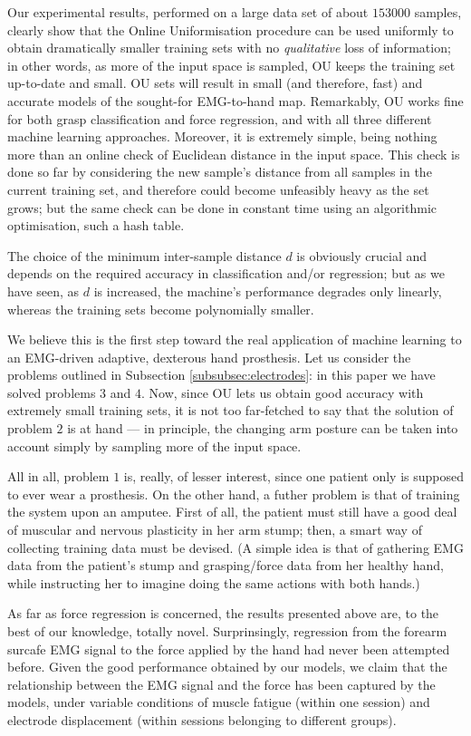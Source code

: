Our experimental results, performed on a large data set of about
$153000$ samples, clearly show that the Online Uniformisation
procedure can be used uniformly to obtain dramatically smaller
training sets with no \emph{qualitative} loss of information; in other
words, as more of the input space is sampled, OU keeps the training
set up-to-date and small. OU sets will result in small (and therefore,
fast) and accurate models of the sought-for EMG-to-hand
map. Remarkably, OU works fine for both grasp classification and force
regression, and with all three different machine learning
approaches. Moreover, it is extremely simple, being nothing more than
an online check of Euclidean distance in the input space. This check
is done so far by considering the new sample's distance from all
samples in the current training set, and therefore could become
unfeasibly heavy as the set grows; but the same check can be done in
constant time using an algorithmic optimisation, such a hash table.

The choice of the minimum inter-sample distance $d$ is obviously
crucial and depends on the required accuracy in classification and/or
regression; but as we have seen, as $d$ is increased, the machine's
performance degrades only linearly, whereas the training sets become
polynomially smaller.

We believe this is the first step toward the real application of
machine learning to an EMG-driven adaptive, dexterous hand
prosthesis. Let us consider the problems outlined in Subsection
\ref{subsubsec:electrodes}: in this paper we have solved problems
$3$ and $4$. Now, since OU lets us obtain good accuracy with extremely
small training sets, it is not too far-fetched to say that the
solution of problem $2$ is at hand --- in principle, the changing arm
posture can be taken into account simply by sampling more of the input
space.

All in all, problem $1$ is, really, of lesser interest, since one
patient only is supposed to ever wear a prosthesis. On the other hand,
a futher problem is that of training the system upon an amputee. First
of all, the patient must still have a good deal of muscular and
nervous plasticity in her arm stump; then, a smart way of collecting
training data must be devised. (A simple idea is that of gathering EMG
data from the patient's stump and grasping/force data from her healthy
hand, while instructing her to imagine doing the same actions with
both hands.)

As far as force regression is concerned, the results presented above
are, to the best of our knowledge, totally novel. Surprinsingly,
regression from the forearm surcafe EMG signal to the force applied by
the hand had never been attempted before. Given the good performance
obtained by our models, we claim that the relationship between the EMG
signal and the force has been captured by the models, under variable
conditions of muscle fatigue (within one session) and electrode
displacement (within sessions belonging to different groups).


